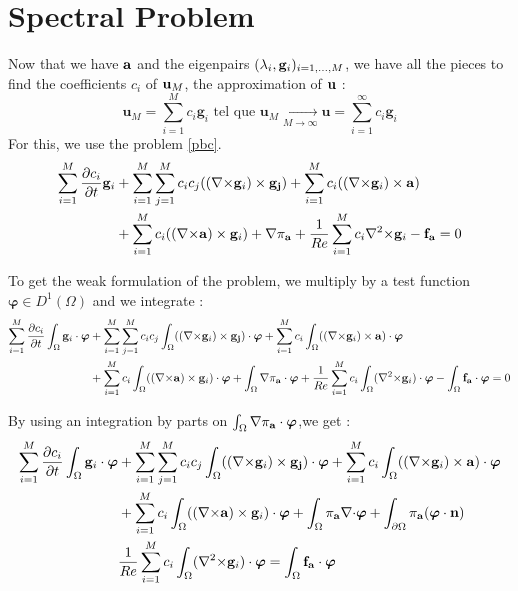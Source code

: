 \section{Spectral Problem}
\label{spectre}
Now that we have ${\mathbf{a}}$ and the eigenpairs $(\lambda_i,{\mathbf{g}}_i)_{i=1,\dots,M}$, we have all the pieces to find the coefficients $c_i$ of ${\mathbf{u}}_M$, the approximation of ${\mathbf{u}}$ :
\[\mathbf{u}_M= \sum_{i=1}^M c_i\mathbf{g}_i\mbox{ tel que } \mathbf{u}_M\underset{M\rightarrow\infty}{\longrightarrow} \mathbf{u}=\sum_{i=1}^\infty c_i\mathbf{g}_i\]
For this, we use the problem \ref{pbc}.
\begin{align*}
\sum_{i=1}^M\frac{\partial c_i}{\partial t}\mathbf{g}_i &+ \sum_{i=1}^M\sum_{j=1}^Mc_ic_j(({\nabla\times}\mathbf{g}_i)\times \mathbf{g_j}) + \sum_{i=1}^Mc_i(({\nabla\times}\mathbf{g}_i)\times \mathbf{a})\\
& +  \sum_{i=1}^Mc_i(({\nabla\times}\mathbf{a})\times \mathbf{g}_i) + {\nabla} \pi_{\mathbf{a}} +\frac{1}{Re}\sum_{i=1}^Mc_i{\nabla^2\times}\mathbf{g}_i - \mathbf{f_a} = 0\\
\end{align*}

To get the weak formulation of the problem, we multiply by a test function $\bm{\varphi}\in D^1(\Omega)$ and we integrate :
\begin{align*}
\sum_{i=1}^M\frac{\partial c_i}{\partial t}\int_\Omega\mathbf{g}_i\cdot\bm{\varphi} &+ \sum_{i=1}^M\sum_{j=1}^Mc_ic_j\int_\Omega(({\nabla\times}\mathbf{g}_i)\times \mathbf{g_j})\cdot\bm{\varphi} + \sum_{i=1}^Mc_i\int_\Omega(({\nabla\times}\mathbf{g}_i)\times \mathbf{a})\cdot\bm{\varphi}\\
& +  \sum_{i=1}^Mc_i\int_\Omega(({\nabla\times}\mathbf{a})\times \mathbf{g}_i)\cdot\bm{\varphi} + \int_\Omega{\nabla} \pi_{\mathbf{a}}\cdot\bm{\varphi} +\frac{1}{Re}\sum_{i=1}^Mc_i\int_\Omega({\nabla^2\times}\mathbf{g}_i)\cdot\bm{\varphi} - \int_\Omega\mathbf{f_a}\cdot\bm{\varphi} = 0\\
\end{align*}

By using an integration by parts on $\int_\Omega{\nabla} \pi_{\mathbf{a}}\cdot\bm{\varphi}$,we get :
\begin{align*}
\sum_{i=1}^M\frac{\partial c_i}{\partial t}\int_\Omega\mathbf{g}_i\cdot\bm{\varphi} &+ \sum_{i=1}^M\sum_{j=1}^Mc_ic_j\int_\Omega(({\nabla\times}\mathbf{g}_i)\times \mathbf{g_j})\cdot\bm{\varphi} + \sum_{i=1}^Mc_i\int_\Omega(({\nabla\times}\mathbf{g}_i)\times \mathbf{a})\cdot\bm{\varphi}\\
& +  \sum_{i=1}^Mc_i\int_\Omega(({\nabla\times}\mathbf{a})\times \mathbf{g}_i)\cdot\bm{\varphi} + \int_\Omega\pi_{\mathbf{a}}{\nabla\cdot}\bm{\varphi} + \int_{\partial\Omega}\pi_{\mathbf{a}}(\bm{\varphi}\cdot\mathbf{n})\\
& \frac{1}{Re}\sum_{i=1}^Mc_i\int_\Omega({\nabla^2\times}\mathbf{g}_i)\cdot\bm{\varphi} = \int_\Omega\mathbf{f_a}\cdot\bm{\varphi}\\
\end{align*}

